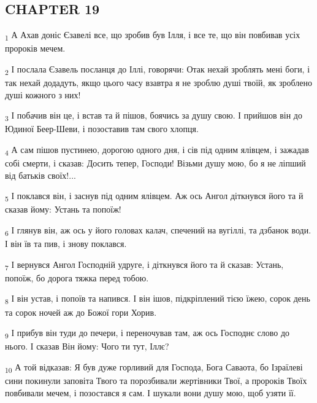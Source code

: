 \subsection{CHAPTER 19}
\begin{tcolorbox}
\textsubscript{1} А Ахав доніс Єзавелі все, що зробив був Ілля, і все те, що він повбивав усіх пророків мечем.
\end{tcolorbox}
\begin{tcolorbox}
\textsubscript{2} І послала Єзавель посланця до Іллі, говорячи: Отак нехай зроблять мені боги, і так нехай додадуть, якщо цього часу взавтра я не зроблю душі твоїй, як зроблено душі кожного з них!
\end{tcolorbox}
\begin{tcolorbox}
\textsubscript{3} І побачив він це, і встав та й пішов, боячись за душу свою. І прийшов він до Юдиної Беер-Шеви, і позоставив там свого хлопця.
\end{tcolorbox}
\begin{tcolorbox}
\textsubscript{4} А сам пішов пустинею, дорогою одного дня, і сів під одним ялівцем, і зажадав собі смерти, і сказав: Досить тепер, Господи! Візьми душу мою, бо я не ліпший від батьків своїх!...
\end{tcolorbox}
\begin{tcolorbox}
\textsubscript{5} І поклався він, і заснув під одним ялівцем. Аж ось Ангол діткнувся його та й сказав йому: Устань та попоїж!
\end{tcolorbox}
\begin{tcolorbox}
\textsubscript{6} І глянув він, аж ось у його головах калач, спечений на вугіллі, та дзбанок води. І він їв та пив, і знову поклався.
\end{tcolorbox}
\begin{tcolorbox}
\textsubscript{7} І вернувся Ангол Господній удруге, і діткнувся його та й сказав: Устань, попоїж, бо дорога тяжка перед тобою.
\end{tcolorbox}
\begin{tcolorbox}
\textsubscript{8} І він устав, і попоїв та напився. І він ішов, підкріплений тією їжею, сорок день та сорок ночей аж до Божої гори Хорив.
\end{tcolorbox}
\begin{tcolorbox}
\textsubscript{9} І прибув він туди до печери, і переночував там, аж ось Господнє слово до нього. І сказав Він йому: Чого ти тут, Іллє?
\end{tcolorbox}
\begin{tcolorbox}
\textsubscript{10} А той відказав: Я був дуже горливий для Господа, Бога Саваота, бо Ізраїлеві сини покинули заповіта Твого та порозбивали жертівники Твої, а пророків Твоїх повбивали мечем, і позостався я сам. І шукали вони душу мою, щоб узяти її.
\end{tcolorbox}
